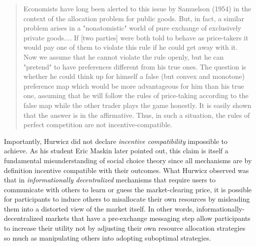 \documentclass[sigconf,anonymous]{aamas}
\begin{document}
\begin{quote}
Economists have long been alerted to this issue by Samuelson (1954) in the context of the allocation problem for public goods. But, in fact, a similar problem arises in a "nonatomistic" world of pure exchange of exclusively private goods.... If [two parties] were both told to behave as price-takers it would pay one of them to violate this rule if he could get away with it. Now we assume that he cannot violate the rule openly, but he can "pretend" to have preferences different from his true ones. The question is whether he could think up for himself a false (but convex and monotone) preference map which would be more advantageous for him than his true one, assuming that he will follow the rules of price-taking according to the false map while the other trader plays the game honestly. It is easily shown that the answer is in the affirmative. Thus, in such a situation, the rules of perfect competition are not incentive-compatible.
\end{quote}

Importantly, Hurwicz did not declare \textit{incentive compatibility} impossible to achieve. As his student Eric Maskin later pointed out, this claim is itself a fundamental misunderstanding of social choice theory since all mechanisms are by definition incentive compatible with their outcomes. What Hurwicz observed was that in \textit{informationally decentralized} mechanisms that require users to communicate with others to learn or guess the market-clearing price, it is possible for participants to induce others to misallocate their own resources by misleading them into a distorted view of the market itself. In other words, informationally-decentralized markets that have a pre-exchange messaging step allow participants to increase their utility not by adjusting their own resource allocation strategies so much as manipulating others into adopting suboptimal strategies.
\end{document}

